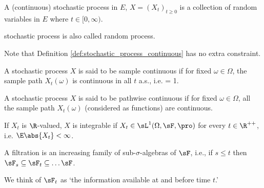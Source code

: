 \begin{definition}\label{def:stochastic_process_continuous}
A (continuous) stochastic process in $E$, $X = (X_t)_{t\geq 0}$ is a collection of random variables in $E$ where $t\in [0,\infty)$.
\end{definition}

\begin{remark}
stochastic process is also called random process.
\end{remark}

Note that Definition \ref{def:stochastic_process_continuous} has no extra constraint.

\begin{definition}\label{def:sample_continuous_process}
A stochastic process $X$ is said to be sample continuous if for fixed $\omega \in \Omega$, the sample path $X_t(\omega)$ is continuous in all $t$ a.s., i.e.
\be
\pro{} = 1.
\ee
\end{definition}

\begin{definition}\label{def:pathwise_continuous_process}
A stochastic process $X$ is said to be pathwise continuous if for fixed $\omega \in \Omega$, all the sample path $X_t(\omega)$ (considered as functions) are continuous.
\end{definition}


\begin{definition}\label{def:integrable_stochastic_process_continuous}
If $X_t$ is $\R$-valued, $X$ is integrable if $X_t \in \sL^1(\Omega,\sF,\pro)$ for every $t\in \R^{++}$, i.e. $\E\abs{X_t} <\infty$.
\end{definition}

\begin{definition}\label{def:filtration_continuous}
A filtration is an increasing family of sub-$\sigma$-algebras of $\sF$, i.e., if $s \leq t$ then $\sF_{s}\subseteq \sF_{t}\subseteq \dots \sF$. %
\end{definition}

\begin{remark}
We think of $\sF_t$ as `the information available at and before time $t$.'
\end{remark}

